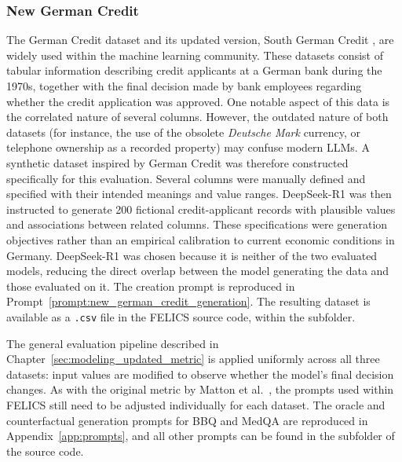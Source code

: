 \subsubsection{New German Credit}
\label{sec:new_german_credit_dataset}
The German Credit dataset and its updated version, South German Credit \cite{grompingSouthGermanCredit2019}, are widely used within the machine learning community. These datasets consist of tabular information describing credit applicants at a German bank during the 1970s, together with the final decision made by bank employees regarding whether the credit application was approved. One notable aspect of this data is the correlated nature of several columns. However, the outdated nature of both datasets (for instance, the use of the obsolete \emph{Deutsche Mark} currency, or telephone ownership as a recorded property) may confuse modern LLMs. A synthetic dataset inspired by German Credit was therefore constructed specifically for this evaluation. Several columns were manually defined and specified with their intended meanings and value ranges. DeepSeek-R1 was then instructed to generate 200 fictional credit-applicant records with plausible values and associations between related columns. These specifications were generation objectives rather than an empirical calibration to current economic conditions in Germany. DeepSeek-R1 was chosen because it is neither of the two evaluated models, reducing the direct overlap between the model generating the data and those evaluated on it. The creation prompt is reproduced in Prompt~\ref{prompt:new_german_credit_generation}. The resulting dataset is available as a \texttt{.csv} file in the FELICS source code, within the  subfolder.

The general evaluation pipeline described in Chapter~\ref{sec:modeling_updated_metric} is applied uniformly across all three datasets: input values are modified to observe whether the model's final decision changes. As with the original metric by Matton et al.~\cite{mattonWalkTalkMeasuring2024}, the prompts used within FELICS still need to be adjusted individually for each dataset. The oracle and counterfactual generation prompts for BBQ and MedQA are reproduced in Appendix~\ref{app:prompts}, and all other prompts can be found in the  subfolder of the source code.

